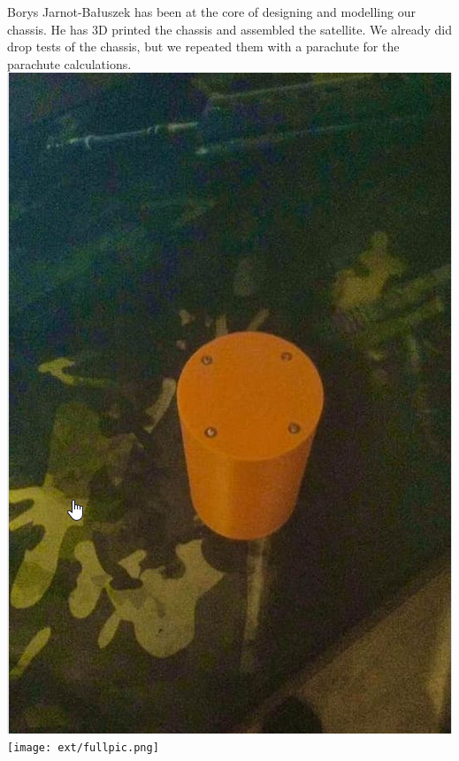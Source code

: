 \documentclass[class=report, crop=false]{standalone}
\begin{document}
Borys Jarnot-Bałuszek has been at the core of designing and modelling our chassis.
He has 3D printed the chassis and assembled the satellite. We already did drop tests of the chassis, but we repeated them with a parachute for the parachute calculations. \\
\includegraphics[width=\columnwidth]{ext/3dprint.png}
\texttt{[image: ext/fullpic.png]}
\end{document}
